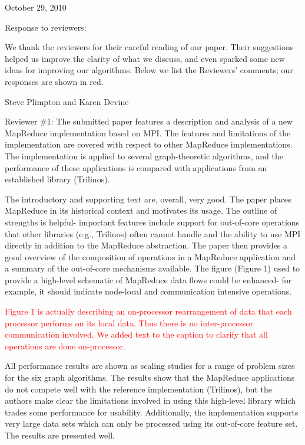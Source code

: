 \documentclass[11pt]{article}
\newcommand{\revise}[1]{\textcolor{red}{#1}}
\begin{document}
October 29, 2010

Response to reviewers:

We thank the reviewers for their careful reading of our paper.  Their
suggestions helped us improve the clarity of what we discuss, and even
sparked some new ideas for improving our algorithms.  Below we list
the Reviewers' comments; our responses are shown in red.

Steve Plimpton and Karen Devine

\vspace{0.5 in}

Reviewer \#1: The submitted paper features a description and analysis of a
new MapReduce implementation based on MPI.  The features and limitations
of the implementation are covered with respect to other MapReduce
implementations.  The implementation is applied to several
graph-theoretic algorithms, and the performance of these applications
is compared with applications from an established library (Trilinos).

The introductory and supporting text are, overall, very good.  The
paper places MapReduce in its historical context and motivates its
usage.  The outline of strengths is helpful- important features
include support for out-of-core operations that other libraries (e.g.,
Trilinos) often cannot handle and the ability to use MPI directly in
addition to the MapReduce abstraction.  The paper then provides a good
overview of the composition of operations in a MapReduce application
and a summary of the out-of-core mechanisms available.  The figure
(Figure 1) used to provide a high-level schematic of MapReduce data
flows could be enhanced- for example, it should indicate node-local
and communication intensive operations.

\revise{Figure 1 is actually describing an on-processor rearrangement
of data that each processor performs on its local data.  Thus there is
no inter-processor communication involved.  We added text to the caption
to clarify that all operations are done on-processor.}

All performance results are shown as scaling studies for a range of
problem sizes for the six graph algorithms.  The results show that the
MapReduce applications do not compete well with the reference
implementation (Trilinos), but the authors make clear the limitations
involved in using this high-level library which trades some
performance for usability.  Additionally, the implementation supports
very large data sets which can only be processed using its out-of-core
feature set.  The results are presented well.
\end{document}
